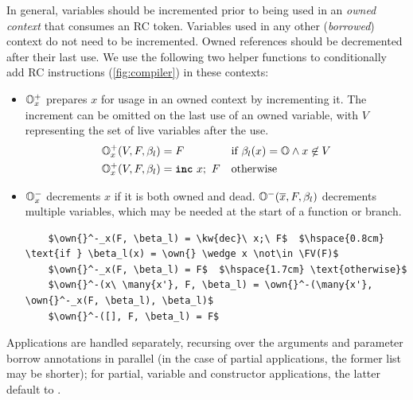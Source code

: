 \documentclass[sigconf]{acmart}
\begin{document}
In general, variables should be incremented prior to being used in an \emph{owned context}
that consumes an RC token.
Variables used in any other (\emph{borrowed}) context do not need to be
incremented. Owned references should be decremented after their last use. We use
the following two helper functions to conditionally add RC instructions
(\cref{fig:compiler}) in these contexts:
\begin{itemize}
\item $\mathbb{O}{}^+_x$ prepares $x$ for usage in an owned context by incrementing it. The
  increment can be omitted on the last use of an owned variable, with $V$
  representing the set of live variables after the use.
  \begin{align*}
    \mathbb{O}{}^+_x(V, F, \beta_l) &= F &&\text{if } \beta_l(x) = \mathbb{O}{} \wedge x \not\in V \\
    \mathbb{O}{}^+_x(V, F, \beta_l) &= \texttt{\textbf{inc}}\ x;\ F &&\text{otherwise}
  \end{align*}
\item $\mathbb{O}{}^-_x$ decrements $x$ if it is both owned and dead.
  $\mathbb{O}{}^-(\overline{x}, F, \beta_l)$ decrements multiple variables, which may be needed at
  the start of a function or  branch.
  \begin{lstlisting}
    $\own{}^-_x(F, \beta_l) = \kw{dec}\ x;\ F$  $\hspace{0.8cm} \text{if } \beta_l(x) = \own{} \wedge x \not\in \FV(F)$
    $\own{}^-_x(F, \beta_l) = F$  $\hspace{1.7cm} \text{otherwise}$
    $\own{}^-(x\ \many{x'}, F, \beta_l) = \own{}^-(\many{x'}, \own{}^-_x(F, \beta_l), \beta_l)$
    $\own{}^-([], F, \beta_l) = F$
  \end{lstlisting}
\end{itemize}
Applications are handled separately, recursing over the arguments and parameter
borrow annotations in parallel (in the case of partial applications, the former
list may be shorter); for partial, variable and constructor applications, the
latter default to \own{}.
\end{document}
